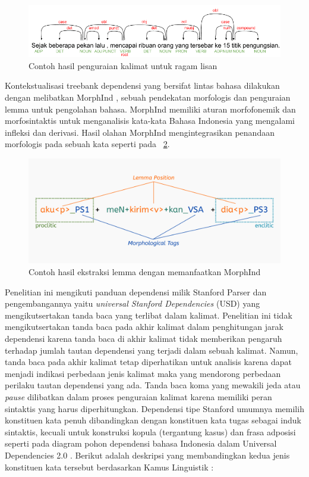 \begin{figure}
	\centering \includegraphics[width=0.85
	\textwidth] {pics/contohlisan.png} \caption{Contoh hasil penguraian kalimat untuk ragam lisan} 
\label{fig:contohlisan} \end{figure}

Kontekstualisasi treebank dependensi yang bersifat lintas bahasa dilakukan dengan melibatkan MorphInd \citep{larasati2011indonesian}, sebuah pendekatan morfologis dan penguraian lemma untuk pengolahan bahasa. MorphInd memiliki aturan morfofonemik dan morfosintaktis untuk menganalisis kata-kata Bahasa Indonesia yang mengalami infleksi dan derivasi. Hasil olahan MorphInd mengintegrasikan penandaan morfologis pada sebuah kata seperti pada \pic~\ref{fig:morphind_schema}.

\begin{figure}
	\centering \includegraphics[width=1
	\textwidth] {pics/morphind_schema.png} \caption{Contoh hasil ekstraksi lemma dengan memanfaatkan MorphInd \citep{larasati2011indonesian} } 
\label{fig:morphind_schema} 
\end{figure}

Penelitian ini mengikuti panduan dependensi milik Stanford Parser \citep{de2008stanford} dan pengembangannya yaitu \textit{universal Stanford Dependencies} (USD) \citep{de2014universal} yang mengikutsertakan tanda baca yang terlibat dalam kalimat. Penelitian ini tidak mengikutsertakan tanda baca pada akhir kalimat dalam penghitungan jarak dependensi karena tanda baca di akhir kalimat tidak memberikan pengaruh terhadap jumlah tautan dependensi yang terjadi dalam sebuah kalimat. Namun, tanda baca pada akhir kalimat tetap diperhatikan untuk analisis karena dapat menjadi indikasi perbedaan jenis kalimat maka yang mendorong perbedaan perilaku tautan dependensi yang ada. Tanda baca koma yang mewakili jeda atau \textit{pause} dilibatkan dalam proses penguraian kalimat karena memiliki peran sintaktis yang harus diperhitungkan. Dependensi tipe Stanford \citep{de2008stanford} umumnya memilih konstituen kata penuh dibandingkan dengan konstituen kata tugas sebagai induk sintaktis, kecuali untuk konstruksi kopula (tergantung kasus) dan frasa adposisi seperti pada diagram pohon dependensi bahasa Indonesia dalam Universal Dependencies 2.0 \citep{nivre2017universal}. Berikut adalah deskripsi yang membandingkan kedua jenis konstituen kata tersebut berdasarkan Kamus Linguistik \citep{kridalaksana2008kamus}:

